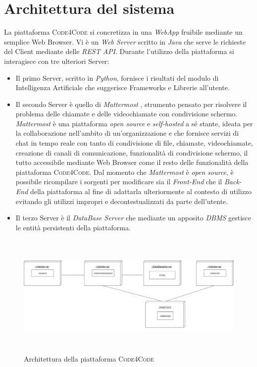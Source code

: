 \section{Architettura del sistema} %
La piattaforma \textsc{Code4Code} si concretizza in una \emph{WebApp} fruibile mediante un semplice Web Browser. Vi è un \emph{Web Server} scritto in \emph{Java} che serve le richieste del Client mediante delle \emph{REST API}. Durante l'utilizzo della piattaforma si interagisce con tre ulteriori Server:
\begin{itemize}
    \item Il primo Server, scritto in \emph{Python}, fornisce i risultati del modulo di Intelligenza Artificiale che suggerisce Frameworks e Librerie all'utente.  
    \item Il secondo Server è quello di \emph{Mattermost} \cite{mattermost}, strumento pensato per risolvere il problema delle chiamate e delle videochiamate con condivisione schermo. \emph{Mattermost} è una piattaforma \emph{open source} e \emph{self-hosted} a sé stante, ideata per la collaborazione nell'ambito di un'organizzazione e che fornisce servizi di chat in tempo reale con tanto di condivisione di file, chiamate, videochiamate, creazione di canali di comunicazione, funzionalità di condivisione schermo, il tutto accessibile mediante Web Browser come il resto delle funzionalità della piattaforma \textsc{Code4Code}. Dal momento che \emph{Mattermost} è \emph{open source}, è possibile ricompilare i sorgenti per modificare sia il \emph{Front-End} che il \emph{Back-End} della piattaforma al fine di adattarla ulteriormente al contesto di utilizzo evitando gli utilizzi impropri e decontestualizzati da parte dell'utente.
    \item Il terzo Server è il \emph{DataBase Server} che mediante un apposito \emph{DBMS} gestisce le entità persistenti della piattaforma.
\end{itemize} 
\begin{figure}[!htb]
    \includegraphics[width=\textwidth, height=6cm]{capitoli/images/progettazione_c4c.png}
    \caption{Architettura della piattaforma \textsc{Code4Code}}
    \label{fig:progettazione_c4c}
\end{figure}

